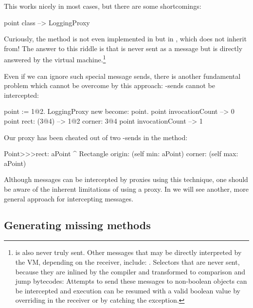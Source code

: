\documentclass[a4paper,10pt,twoside]{book}
\begin{document}
{This works nicely in most cases, but there are some shortcomings:
\begin{code}{}
point class --> LoggingProxy
\end{code}
Curiously, the method  is not even implemented in  but in , which  does not inherit from!
The answer to this riddle is that  is never sent as a message but is directly answered by the virtual machine.\footnote{ is also never truly sent.
Other messages that may be directly interpreted by the VM, depending on the receiver, include:
\ct{+- < > <= >= = ~= * / \ ==}
.
Selectors that are never sent, because they are inlined by the compiler and transformed to comparison and jump bytecodes:
Attempts to send these messages to non-boolean objects can be intercepted and execution can be resumed with a valid boolean value by overriding  in the receiver or by catching the  exception.
}%

Even if we can ignore such special message sends, there is another fundamental problem which cannot be overcome by this approach: \self-sends cannot be intercepted:
\begin{code}{}
point := 1@2.
LoggingProxy new become: point.
point invocationCount --> 0
point rect: (3@4)        --> 1@2 corner: 3@4
point invocationCount --> 1
\end{code}

Our proxy has been cheated out of two \self-sends in the  method:
\begin{code}{}
Point>>>rect: aPoint 
	^ Rectangle  origin: (self min: aPoint) corner: (self max: aPoint)
\end{code}

Although messages can be intercepted by proxies using this technique, one should be aware of the inherent limitations of using a proxy.  In  we will see another, more general approach for intercepting messages.

\subsection{Generating missing methods}

}
\end{document}
